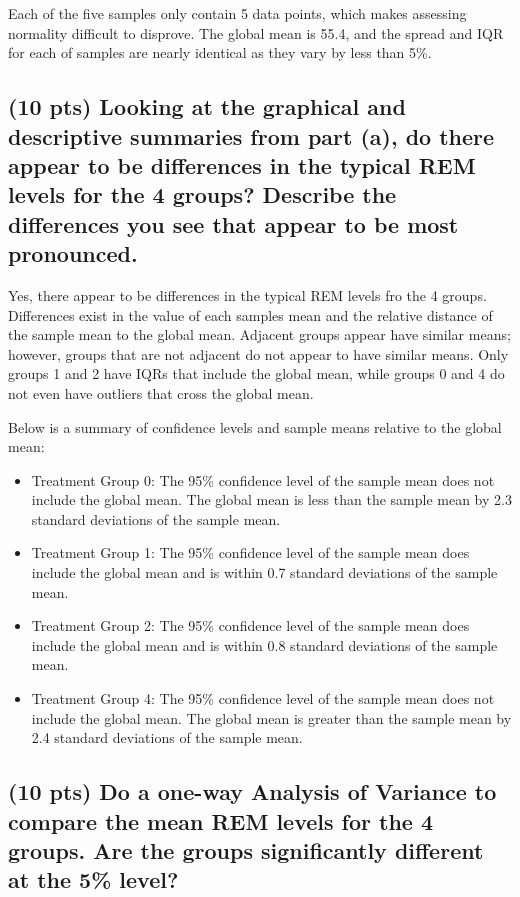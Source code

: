 \documentclass{article}\usepackage[]{graphicx}\usepackage[]{color}
\begin{document}
Each of the five samples only contain 5 data points, which makes assessing normality difficult to disprove.  The global mean is 55.4, and the spread and IQR for each of samples are nearly identical as they vary by less than 5\%.

\subsection{(10 pts) Looking at the graphical and descriptive summaries from part (a), do there appear to be differences in the typical REM levels for the 4 groups? Describe the differences you see that appear to be most pronounced.}

Yes, there appear to be differences in the typical REM levels fro the 4 groups.  Differences exist in the value of each samples mean and the relative distance of the sample mean to the global mean.  Adjacent groups appear have similar means; however, groups that are not adjacent do not appear to have similar means.  Only groups 1 and 2 have IQRs that include the global mean, while groups 0 and 4 do not even have outliers that cross the global mean.

Below is a summary of confidence levels and sample means relative to the global mean:

\begin{itemize}
  \item Treatment Group 0:  The 95\% confidence level of the sample mean does not include the global mean.  The global mean is less than the sample mean by 2.3 standard deviations of the sample mean.
  \item Treatment Group 1:  The 95\% confidence level of the sample mean does include the global mean and is within 0.7 standard deviations of the sample mean.
  \item Treatment Group 2:  The 95\% confidence level of the sample mean does include the global mean and is within 0.8 standard deviations of the sample mean.
  \item Treatment Group 4:  The 95\% confidence level of the sample mean does not include the global mean.  The global mean is greater than the sample mean by 2.4 standard deviations of the sample mean.
\end{itemize}

\subsection{(10 pts) Do a one-way Analysis of Variance to compare the mean REM levels for the 4 groups. Are the groups significantly different at the 5\% level?}
\end{document}
